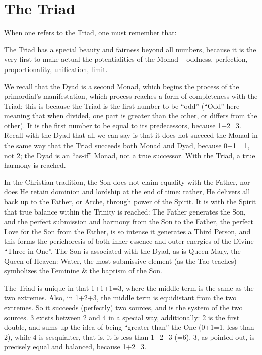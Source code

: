 \section{The Triad}

When one refers to the Triad, one must remember that:

\begin{quotex}
The Triad has a special beauty and fairness beyond all numbers, because it is the very first to make actual the potentialities of the Monad -- oddness, perfection, proportionality, unification, limit.
\end{quotex}


We recall that the Dyad is a second Monad, which begins the process of the primordial's manifestation, which process reaches a form of completeness with the Triad; this is because the Triad is the first number to be ``odd'' (``Odd'' here meaning that when divided, one part is greater than the other, or differs from the other). It is the first number to be equal to its predecessors, because 1+2=3. Recall with the Dyad that all we can say is that it does not succeed the Monad in the same way that the Triad succeeds both Monad and Dyad, because 0+1= 1, not 2; the Dyad is an ``as-if'' Monad, not a true successor. With the Triad, a true harmony is reached.

In the Christian tradition, the Son does not claim equality with the Father, nor does He retain dominion and lordship at the end of time: rather, He delivers all back up to the Father, or Arche, through power of the Spirit. It is with the Spirit that true balance within the Trinity is reached: The Father generates the Son, and the perfect submission and harmony from the Son to the Father, the perfect Love for the Son from the Father, is so intense it generates a Third Person, and this forms the perichoresis of both inner essence and outer energies of the Divine ``Three-in-One''. The Son is associated with the Dyad, as is Queen Mary, the Queen of Heaven: Water, the most submissive element (as the Tao teaches) symbolizes the Feminine \& the baptism of the Son.

The Triad is unique in that 1+1+1=3, where the middle term is the same as the two extremes. Also, in 1+2+3, the middle term is equidistant from the two extremes. So it succeeds (perfectly) two sources, and is the system of the two sources. 3 exists between 2 and 4 in a special way, additionally: 2 is the first double, and sums up the idea of being ``greater than'' the One (0+1=1, less than 2), while 4 is sesquialter, that is, it is less than 1+2+3 (=6). 3, as pointed out, is precisely equal and balanced, because 1+2=3.


